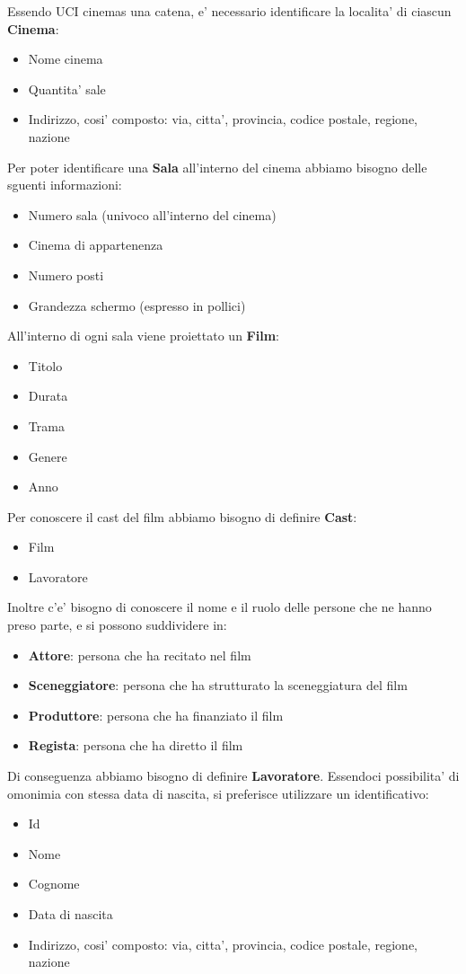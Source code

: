 \documentclass[10pt]{article}
\begin{document}
	Essendo UCI cinemas una catena, e' necessario identificare la localita' di ciascun {\bf Cinema}:
	\begin{itemize}
		\item Nome cinema
		\item Quantita' sale
		\item Indirizzo, cosi' composto: via, citta', provincia, codice postale, regione, nazione
	\end{itemize}
	Per poter identificare una {\bf Sala} all'interno del cinema abbiamo bisogno delle sguenti informazioni:
	\begin{itemize}
		\item Numero sala (univoco all'interno del cinema)
		\item Cinema di appartenenza
		\item Numero posti
		\item Grandezza schermo (espresso in pollici)
	\end{itemize}
	All'interno di ogni sala viene proiettato un {\bf Film}:
	\begin{itemize}
		\item Titolo
		\item Durata
		\item Trama
		\item Genere
		\item Anno
	\end{itemize}
	Per conoscere il cast del film abbiamo bisogno di definire \textbf{Cast}:
	\begin{itemize}
		\item Film
		\item Lavoratore
	\end{itemize}
	Inoltre c'e' bisogno di conoscere il nome e il ruolo delle persone che ne hanno preso parte, e si possono suddividere in:
	\begin{itemize}
		\item {\bf Attore}: persona che ha recitato nel film 
		\item {\bf Sceneggiatore}: persona che ha strutturato la sceneggiatura del film 
		\item {\bf Produttore}: persona che ha finanziato il film 
		\item {\bf Regista}: persona che ha diretto il film
	\end{itemize}		 
	Di conseguenza abbiamo bisogno di definire {\bf Lavoratore}. Essendoci possibilita' di omonimia con stessa data di nascita, si preferisce utilizzare un identificativo:
	\begin{itemize}
		\item Id
		\item Nome
		\item Cognome
		\item Data di nascita
		\item Indirizzo, cosi' composto: via, citta', provincia, codice postale, regione, nazione
	\end{itemize}
\end{document}

